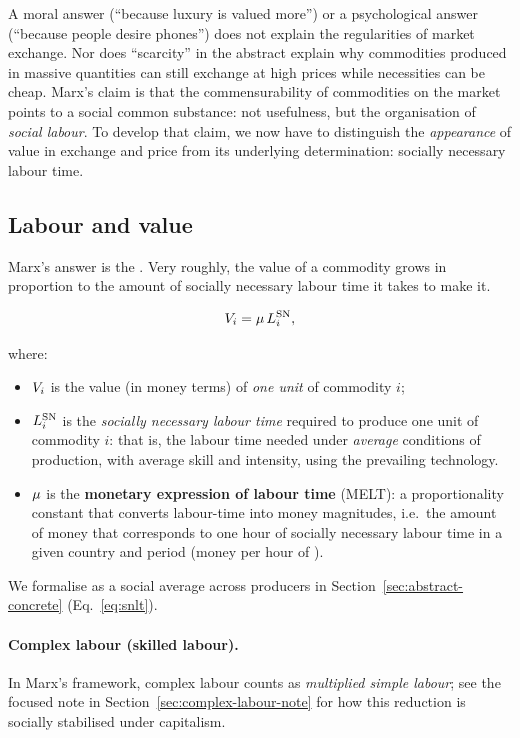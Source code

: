 A moral answer (``because luxury is valued more'') or a psychological answer (``because people desire phones'') does
not explain the regularities of market exchange. Nor does ``scarcity'' in the abstract explain why commodities produced
in massive quantities can still exchange at high prices while necessities can be cheap. Marx’s claim is that the
commensurability of commodities on the market points to a social common substance: not usefulness, but the organisation
of \emph{social labour}. To develop that claim, we now have to distinguish the \emph{appearance} of value in exchange
and price from its underlying determination: socially necessary labour time.


\subsection{Labour and value}
\label{sec:labour-and-value}

Marx's answer is the \LTV. Very roughly, the value of a commodity grows in
proportion to the amount of socially necessary labour time it takes to make it.

\begin{equation}
  V_{i} = \mu\,L^{\mathrm{SN}}_{i},
\end{equation}

where:
\begin{itemize}
  \item $V_{i}$ is the value (in money terms) of \emph{one unit} of commodity $i$;
  \item $L^{\mathrm{SN}}_{i}$ is the \emph{socially necessary labour time} required
        to produce one unit of commodity $i$: that is, the labour time needed
        under \emph{average} conditions of production, with average skill and
        intensity, using the prevailing technology.
\item $\mu$ is the \textbf{monetary expression of labour time} (MELT): a proportionality
      constant that converts labour-time into money magnitudes, i.e.\ the amount of money
      that corresponds to one hour of socially necessary labour time in a given country
      and period (money per hour of \snlt).
\end{itemize}

We formalise \snlt{} as a social average across producers in Section~\ref{sec:abstract-concrete} (Eq.~\eqref{eq:snlt}).


\paragraph{Complex labour (skilled labour).}
In Marx’s framework, complex labour counts as \emph{multiplied simple labour}; see the focused note in
Section~\ref{sec:complex-labour-note} for how this reduction is socially stabilised under capitalism.


